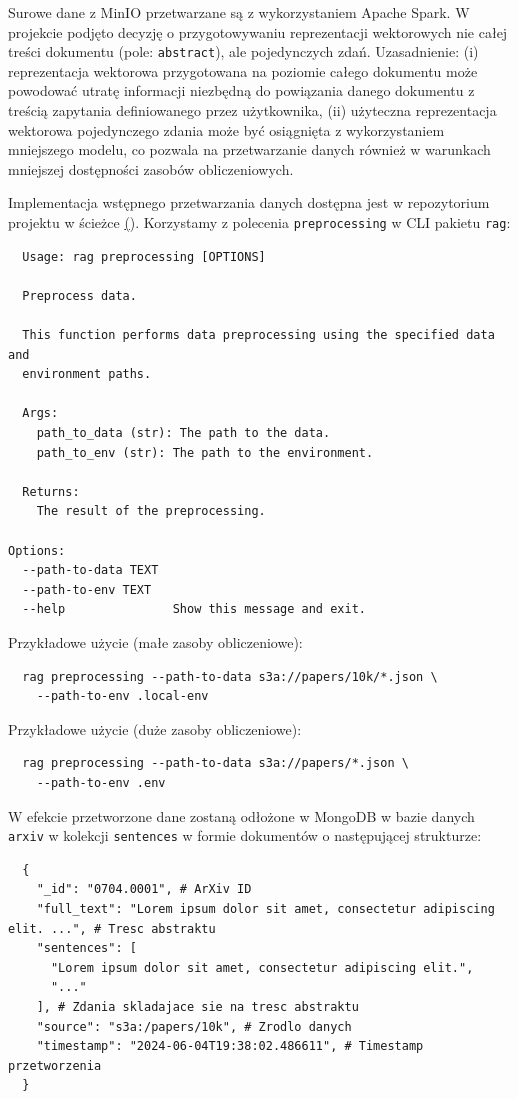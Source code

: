 \documentclass[10pt]{article}
\begin{document}
Surowe dane z MinIO przetwarzane są z wykorzystaniem Apache Spark. W projekcie podjęto decyzję o przygotowywaniu reprezentacji wektorowych nie całej treści dokumentu (pole: \texttt{abstract}), ale pojedynczych zdań. Uzasadnienie: (i) reprezentacja wektorowa przygotowana na poziomie całego dokumentu może powodować utratę informacji niezbędną do powiązania danego dokumentu z treścią zapytania definiowanego przez użytkownika, (ii) użyteczna reprezentacja wektorowa pojedynczego zdania może być osiągnięta z wykorzystaniem mniejszego modelu, co pozwala na przetwarzanie danych również w warunkach mniejszej dostępności zasobów obliczeniowych.

Implementacja wstępnego przetwarzania danych dostępna jest w repozytorium projektu w ścieżce \href{https://github.com/stasulam/pw-big-data-thesis-public/blob/main/src/rag/processor/preprocessing.py}(). Korzystamy z polecenia \texttt{preprocessing} w CLI pakietu \texttt{rag}:

\begin{lstlisting}
  Usage: rag preprocessing [OPTIONS]

  Preprocess data.

  This function performs data preprocessing using the specified data and
  environment paths.

  Args:
    path_to_data (str): The path to the data.
    path_to_env (str): The path to the environment.

  Returns: 
    The result of the preprocessing.

Options:
  --path-to-data TEXT
  --path-to-env TEXT
  --help               Show this message and exit.
\end{lstlisting}

Przykładowe użycie (małe zasoby obliczeniowe):
\begin{lstlisting}
  rag preprocessing --path-to-data s3a://papers/10k/*.json \
    --path-to-env .local-env
\end{lstlisting}

Przykładowe użycie (duże zasoby obliczeniowe):
\begin{lstlisting}
  rag preprocessing --path-to-data s3a://papers/*.json \
    --path-to-env .env
\end{lstlisting}

W efekcie przetworzone dane zostaną odłożone w MongoDB w bazie danych \texttt{arxiv} w kolekcji \texttt{sentences} w formie dokumentów o następującej strukturze:
\begin{lstlisting}
  {
    "_id": "0704.0001", # ArXiv ID
    "full_text": "Lorem ipsum dolor sit amet, consectetur adipiscing elit. ...", # Tresc abstraktu
    "sentences": [
      "Lorem ipsum dolor sit amet, consectetur adipiscing elit.",
      "..."
    ], # Zdania skladajace sie na tresc abstraktu
    "source": "s3a:/papers/10k", # Zrodlo danych
    "timestamp": "2024-06-04T19:38:02.486611", # Timestamp przetworzenia
  }
\end{lstlisting}
\end{document}
